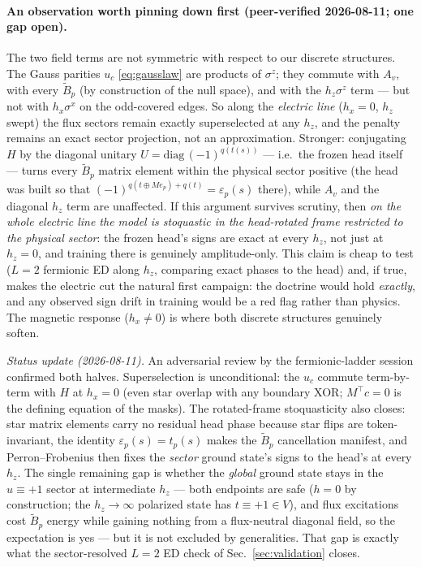 \documentclass[11pt]{article}
\newcommand{\Av}{A_v}
\newcommand{\Bt}{\tilde B_p}
\newcommand{\sx}{\sigma^x}
\newcommand{\sz}{\sigma^z}
\begin{document}
\paragraph{An observation worth pinning down first (peer-verified
2026-08-11; one gap open).}
The two field terms are not symmetric with respect to our discrete
structures. The Gauss parities $u_c$ \eqref{eq:gausslaw} are products of
$\sz$; they commute with $\Av$, with every $\Bt$ (by construction of the null
space), and with the $h_z\sz$ term --- but not with $h_x\sx$ on the odd-covered
edges. So along the \emph{electric line} ($h_x=0$, $h_z$ swept) the flux
sectors remain exactly superselected at any $h_z$, and the penalty remains an
exact sector projection, not an approximation. Stronger: conjugating $H$ by
the diagonal unitary $U=\mathrm{diag}\,(-1)^{q(t(s))}$ --- i.e.\ the frozen
head itself --- turns every $\Bt$ matrix element within the physical sector
positive (the head was built so that $(-1)^{q(t\oplus Me_p)+q(t)}
=\varepsilon_p(s)$ there), while $\Av$ and the diagonal $h_z$ term are
unaffected. If this argument survives scrutiny, then \emph{on the whole
electric line the model is stoquastic in the head-rotated frame restricted to
the physical sector}: the frozen head's signs are exact at every $h_z$, not
just at $h_z=0$, and training there is genuinely amplitude-only. This claim
is cheap to test ($L=2$ fermionic ED along $h_z$, comparing exact phases to
the head) and, if true, makes the electric cut the natural first campaign:
the doctrine would hold \emph{exactly}, and any observed sign drift in
training would be a red flag rather than physics. The magnetic response
($h_x\neq0$) is where both discrete structures genuinely soften.

\emph{Status update (2026-08-11).} An adversarial review by the
fermionic-ladder session confirmed both halves. Superselection is
unconditional: the $u_c$ commute term-by-term with $H$ at $h_x=0$ (even star
overlap with any boundary XOR; $M^{\!\top}c=0$ is the defining equation of
the masks). The rotated-frame stoquasticity also closes: star matrix
elements carry no residual head phase because star flips are
token-invariant, the identity $\varepsilon_p(s)=t_p(s)$ makes the $\Bt$
cancellation manifest, and Perron--Frobenius then fixes the \emph{sector}
ground state's signs to the head's at every $h_z$. The single remaining gap
is whether the \emph{global} ground state stays in the $u\equiv+1$ sector at
intermediate $h_z$ --- both endpoints are safe ($h=0$ by construction;
the $h_z\to\infty$ polarized state has $t\equiv+1\in V$), and flux
excitations cost $\Bt$ energy while gaining nothing from a flux-neutral
diagonal field, so the expectation is yes --- but it is not excluded by
generalities. That gap is exactly what the sector-resolved $L=2$ ED check of
Sec.~\ref{sec:validation} closes.
\end{document}
